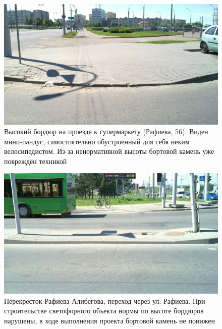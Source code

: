 \documentclass[a4paper,14pt,twoside]{extarticle}
\begin{document}
\begin{figure}[h!]
    \centering
    \includegraphics[width=\textwidth]{Pictures/1000000000000A00000005A0471C66C7.jpg}
    \caption{Высокий бордюр на проезде к супермаркету (Рафиева, 56). Виден мини-пандус, самостоятельно обустроенный для себя неким велосипедистом. Из-за ненормативной высоты бортовой камень уже повреждён техникой}
\end{figure}

\begin{figure}[h!]
    \centering
    \includegraphics[width=\textwidth]{Pictures/1000000000000A00000005A075E04846.jpg}
    \caption{Перекрёсток Рафиева-Алибегова, переход через ул. Рафиева. При строительстве светофорного объекта нормы по высоте бордюров нарушены, в ходе выполнения проекта бортовой камень не понижен}
\end{figure}
\end{document}
